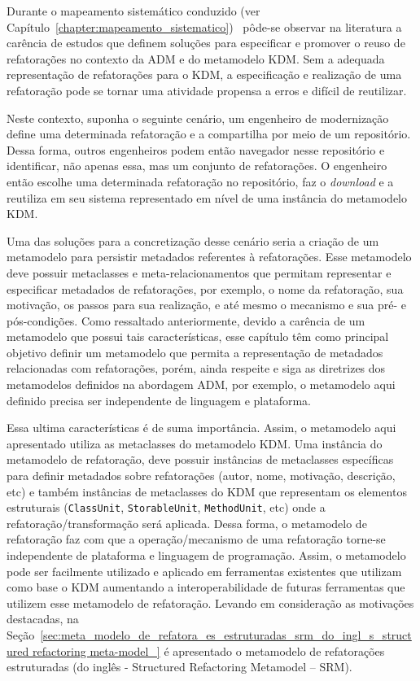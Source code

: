 Durante o mapeamento sistemático conduzido (ver Capítulo~\ref{chapter:mapeamento_sistematico})~\cite{durelli_systematic_mapping} pôde-se observar na literatura a carência de estudos que definem soluções para especificar e promover o reuso de refatorações no contexto da ADM e do metamodelo KDM. Sem a adequada representação de refatorações para o KDM, a especificação e realização de uma refatoração pode se tornar uma atividade propensa a erros e difícil de reutilizar.

Neste contexto, suponha o seguinte cenário, um engenheiro de modernização define uma determinada refatoração e a compartilha por meio de um repositório. Dessa forma, outros engenheiros podem então navegador nesse repositório e identificar, não apenas essa, mas um conjunto de refatorações. O engenheiro então escolhe uma determinada refatoração no repositório, faz o \textit{download} e a reutiliza em seu sistema representado em nível de uma instância do metamodelo KDM. 

Uma das soluções para a concretização desse cenário seria a criação de um metamodelo para persistir metadados referentes à refatorações. Esse metamodelo deve possuir metaclasses e meta-relacionamentos que permitam representar e especificar metadados de refatorações, por exemplo, o nome da refatoração, sua motivação, os passos para sua realização, e até mesmo o mecanismo e sua pré- e pós-condições. Como ressaltado anteriormente, devido a carência de um metamodelo que possui tais características, esse capítulo têm como principal objetivo definir um metamodelo que permita a representação de metadados relacionadas com refatorações, porém, ainda respeite e siga as diretrizes dos metamodelos definidos na abordagem ADM, por exemplo, o metamodelo aqui definido precisa ser independente de linguagem e plataforma.


Essa ultima características é de suma importância. Assim, o metamodelo aqui apresentado utiliza as metaclasses do metamodelo KDM. Uma instância do metamodelo de refatoração, deve possuir instâncias de metaclasses específicas para definir metadados sobre refatorações (autor, nome, motivação, descrição, etc) e também instâncias de metaclasses do KDM que representam os elementos estruturais (\texttt{ClassUnit}, \texttt{StorableUnit}, \texttt{MethodUnit}, etc) onde a refatoração/transformação será aplicada. Dessa forma, o metamodelo de refatoração faz com que a operação/mecanismo de uma refatoração torne-se independente de plataforma e linguagem de programação. Assim, o metamodelo pode ser facilmente utilizado e aplicado em ferramentas existentes que utilizam como base o KDM aumentando a interoperabilidade de futuras ferramentas que utilizem esse metamodelo de refatoração. Levando em consideração as motivações destacadas, na Seção~\ref{sec:meta_modelo_de_refatora_es_estruturadas_srm_do_ingl_s_structured refactoring meta-model_} é apresentado o metamodelo de refatorações estruturadas (do inglês - Structured Refactoring Metamodel – SRM).  



